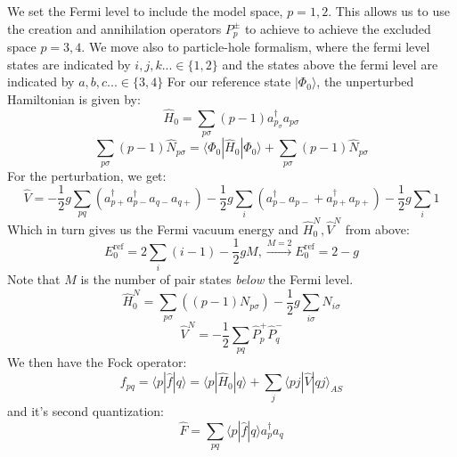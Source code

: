 \documentclass{article}
\begin{document}
\section{}
We set the Fermi level to include the model space, $p = 1, 2$. This allows us to use the creation and annihilation operators $P_p^\pm$ to achieve to achieve the excluded space $p = 3, 4$. We move also to particle-hole formalism, where the fermi level states are indicated by $i,j,k ... \in \{1,2\}$ and the states above the fermi level are indicated by $a, b, c ... \in \{3,4\}$ \newline
For our reference state $|\Phi_0 \rangle$, the unperturbed Hamiltonian is given by:
\begin{equation*}
    \hat H_0  = \sum_{p \sigma} (p-1) a_{p_\sigma}^\dagger a_{p\sigma}
\end{equation*}
\begin{equation*}
    \sum_{p\sigma} (p-1) \hat N_{p\sigma} = \langle \Phi_0 | \hat H_0 | \Phi_0 \rangle + \sum_{p \sigma} (p - 1) \hat N_{p \sigma}
\end{equation*}
For the perturbation, we get:
\begin{equation*}
    \hat V = - \frac{1}{2}g \sum_{pq} \left(a_{p+}^\dagger a_{p-}^\dagger a_{q-} a_{q+} \right) - \frac{1}{2}g \sum_i \left( a_{p-}^\dagger a_{p-} + a_{p+}^\dagger a_{p+} \right) - \frac{1}{2} g \sum_i 1
\end{equation*}
Which in turn gives us the Fermi vacuum energy and $\hat H_0^N, \hat V^N$ from above:
\begin{equation*}
    E_0^\text{ref} = 2 \sum_i (i - 1) - \frac{1}{2} g M, \xrightarrow[]{M = 2} E_0^\text{ref} = 2 - g
\end{equation*}
Note that $M$ is the number of pair states \textit{below} the Fermi level.
\begin{equation*}
    \hat H_0^N = \sum_{p \sigma} \left((p -1) N_{p\sigma}\right) - \frac{1}{2} g \sum_{i \sigma} N_{i \sigma}
\end{equation*}
\begin{equation*}
    \hat V^N = -\frac{1}{2} \sum_{pq} \hat P_p^+ \hat P_q^-
\end{equation*}
We then have the Fock operator:
\begin{equation*}
    f_{pq} = \langle p | \hat f| q \rangle = \langle p | \hat H_0 | q \rangle + \sum_j \langle pj | \hat V | q j \rangle_{AS}
\end{equation*}
and it's second quantization:
\begin{equation*}
    \hat F = \sum_{pq} \langle p | \hat f | q \rangle a_p^\dagger a_q
\end{equation*}
\end{document}
